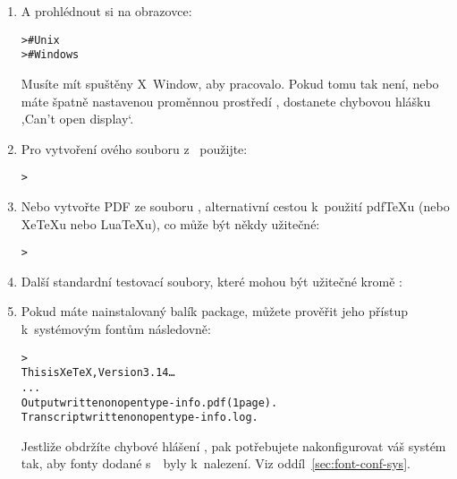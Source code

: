 \documentclass[\classoptions,slovak,english,czech]{\classname}
\newcommand{\singleuv}[1]{,#1`}
\begin{document}
\begin{enumerate}
\item A prohlédnout si \dvi{} na obrazovce:
\begin{alltt}
>     # Unix
>   # Windows
\end{alltt}
Musíte mít spuštěny X~Window, aby  pracovalo. Pokud tomu tak není, nebo máte
špatně nastavenou proměnnou prostředí
, dostanete chybovou hlášku \singleuv{Can't open display}.

\item Pro vytvoření \PS{}ového souboru z~\dvi{} použijte:
\begin{alltt}
> 
\end{alltt}

\item Nebo vytvořte PDF ze souboru \dvi{}, alternativní cestou k~použití
pdf\TeX{}u (nebo Xe\TeX{}u nebo Lua\TeX{}u), co může být někdy užitečné:
\begin{alltt}
	> 
\end{alltt}

\item Další standardní testovací soubory, které mohou být 
užitečné kromě :


\item Pokud máte nainstalovaný balík  package, 
můžete prověřit jeho přístup k~systémovým fontům následovně:
\begin{alltt}
> 
This is XeTeX, Version 3.14\dots
...
Output written on opentype-info.pdf (1 page).
Transcript written on opentype-info.log.
\end{alltt}

Jestliže obdržíte chybové hlášení , pak potřebujete nakonfigurovat váš systém tak, aby 
fonty dodané s~\TL\ byly k~nalezení.  Viz
oddíl~\ref{sec:font-conf-sys}.
\end{enumerate}
\end{document}

